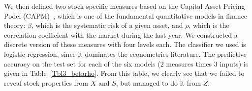 \documentclass[10pt,twocolumn,letterpaper]{article}
\begin{document}


We then defined two stock specific measures based on the Capital Asset Pricing Podel (CAPM)~\cite{sharpe}, which is one of the fundamental quantitative models in finance theory: $\beta$, which is the systematic risk of a given asset, and $\rho$, which is the correlation coefficient with the market during the last year. We constructed a discrete version of these measures with four levels each. The classifier we used is logistic regression, since it dominates the econometrics literature. %
The predictive accuracy on the test set for each of the six models ($2$ measures times $3$ inputs) is given in Table~\ref{Tbl3_betarho}. From this table, we clearly see that we failed to reveal stock properties from $X$ and $S$, but managed to do it from $Z$. 
\end{document}
